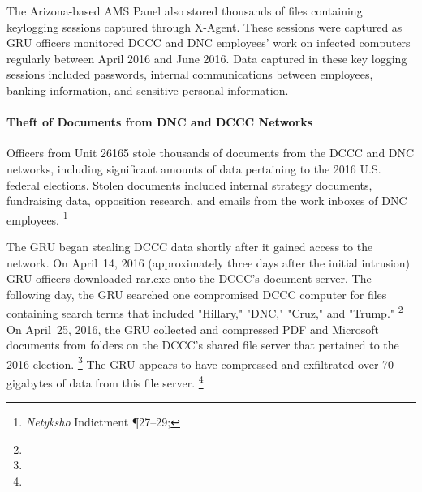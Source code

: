 
The Arizona-based AMS Panel also stored thousands of files containing keylogging sessions captured through X-Agent.
These sessions were captured as GRU officers monitored DCCC and DNC employees' work on infected computers regularly between April 2016 and June 2016.
Data captured in these key logging sessions included passwords, internal communications between employees, banking information, and sensitive personal information.

\paragraph{Theft of Documents from DNC and DCCC Networks}

Officers from Unit 26165 stole thousands of documents from the DCCC and DNC networks, including significant amounts of data pertaining to the 2016 U.S. federal elections.
Stolen documents included internal strategy documents, fundraising data, opposition research, and emails from the work inboxes of DNC employees.%
\footnote{\textit{Netyksho} Indictment \P 27--29; }

The GRU began stealing DCCC data shortly after it gained access to the network.
On April~14, 2016 (approximately three days after the initial intrusion) GRU officers downloaded rar.exe onto the DCCC's document server.
The following day, the GRU searched one compromised DCCC computer for files containing search terms that included "Hillary," "DNC," "Cruz," and "Trump."%
\footnote{}
On April~25, 2016, the GRU collected and compressed PDF and Microsoft documents from folders on the DCCC's shared file server that pertained to the 2016 election.%
\footnote{}
The GRU appears to have compressed and exfiltrated over 70 gigabytes of data from this file server.%
\footnote{}

